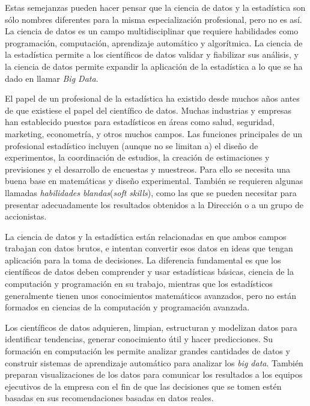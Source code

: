 \documentclass[
  letterpaper,
]{scrbook}
\begin{document}
{}

Estas semejanzas pueden hacer pensar que la ciencia de datos y la
estadística son sólo nombres diferentes para la misma especialización
profesional, pero no es así. La ciencia de datos es un campo
multidisciplinar que requiere habilidades como programación,
computación, aprendizaje automático y algorítmica. La ciencia de la
estadística permite a los científicos de datos validar y fiabilizar sus
análisis, y la ciencia de datos permite expandir la aplicación de la
estadística a lo que se ha dado en llamar \emph{Big Data}.

El papel de un profesional de la estadística ha existido desde muchos
años antes de que existiese el papel del científico de datos. Muchas
industrias y empresas han establecido puestos para estadísticos en áreas
como salud, seguridad, marketing, econometría, y otros muchos campos.
Las funciones principales de un profesional estadístico incluyen (aunque
no se limitan a) el diseño de experimentos, la coordinación de estudios,
la creación de estimaciones y previsiones y el desarrollo de encuestas y
muestreos. Para ello se necesita una buena base en matemáticas y diseño
experimental. También se requieren algunas llamadas \emph{habilidades
blandas}(\emph{soft skills}), como las que se pueden necesitar para
presentar adecuadamente los resultados obtenidos a la Dirección o a un
grupo de accionistas.

La ciencia de datos y la estadística están relacionadas en que ambos
campos trabajan con datos brutos, e intentan convertir esos datos en
ideas que tengan aplicación para la toma de decisiones. La diferencia
fundamental es que los científicos de datos deben comprender y usar
estadísticas básicas, ciencia de la computación y programación en su
trabajo, mientras que los estadísticos generalmente tienen unos
conocimientos matemáticos avanzados, pero no están formados en ciencias
de la computación y programación avanzada.

Los científicos de datos adquieren, limpian, estructuran y modelizan
datos para identificar tendencias, generar conocimiento útil y hacer
predicciones. Su formación en computación les permite analizar grandes
cantidades de datos y construir sistemas de aprendizaje automático para
analizar los \emph{big data}. También preparan visualizaciones de los
datos para comunicar los resultados a los equipos ejecutivos de la
empresa con el fin de que las decisiones que se tomen estén basadas en
sus recomendaciones basadas en datos reales.
\end{document}
